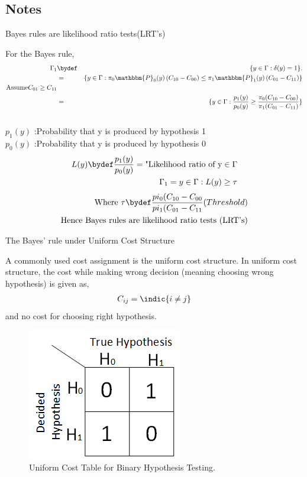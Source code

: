 \documentclass[12pt]{report}
\begin{document}
\begin{itemize}
\section{Notes}
\begin{note}
Bayes rules are likelihood ratio tests(LRT's)
\end{note}
For the Bayes rule, \\
\begin{eqnarray}
\centering
\nonumber
\Gamma_1 &\bydef& \{y \in \Gamma: \delta(y) = 1\}.\\
%
\nonumber
&=&\{y \in \Gamma: \pi_0  \mathbbm{P}_0(y) \left(C_{10}-C_{00} \right) \leq \pi_1  \mathbbm{P}_1(y) \left(C_{01}-C_{11} \right)\}\\
\nonumber
\text{Assume}C_{01} \ge C_{11}\\
\nonumber
&=&\{y \in \Gamma: \frac{p_1(y)}{p_0(y)} \geq  \frac{\pi_0 (C_{10}-C_{00} )}{\pi_1 (C_{01}-C_{11} )}\}\\
\nonumber
\end{eqnarray}
$p_1(y)$ :Probability that y is produced by hypothesis 1\\
$p_0(y)$ :Probability that y is produced by hypothesis 0\\
\begin{align*}
\noindent
L(y) \bydef \frac{p_1(y)}{p_0(y)} = \text{"Likelihood ratio of y} \in \Gamma \\
\noindent
\Gamma_1 = {y \in \Gamma : L(y) \geq \tau }\\
\end{align*}
\begin{align*}
\noindent
\text{Where      }  
 \tau \bydef \frac{pi_0 (C_{10}-C_{00}}{pi_1 (C_{01}-C_{11}} (Threshold)\\
\noindent
\text {Hence Bayes rules are likelihood ratio tests (LRT's)} 
\end{align*}
\begin{note}
The Bayes' rule under Uniform Cost Structure
\end{note}
A commonly used cost assignment is the uniform cost structure. In uniform cost structure, the cost while making wrong decision (meaning choosing wrong hypothesis) is given as, 
\begin{align*}
 C_{ij} =  \indic{i \ne j}  \\
\end{align*}
 and no cost for choosing right hypothesis.

\begin{figure}[h]
\centering
\includegraphics[scale=0.7]{Figures/UniformCostTable}
\caption{Uniform Cost Table for Binary Hypothesis Testing.}
\label{fig:uniformcost}
\end{figure}



\end{itemize}
\end{document}
